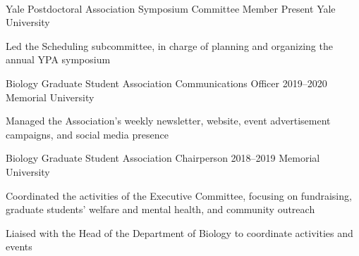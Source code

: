\\

\begin{cventries}

  \cventry
    {Yale Postdoctoral Association} %
    {Symposium Committee Member} %
    {Present} %
    {Yale University} %
    {
      \begin{cvitems} %
        \item {Led the Scheduling subcommittee, in charge of planning and organizing the annual YPA symposium}
      \end{cvitems}
    }

  \cventry
    {Biology Graduate Student Association} %
    {Communications Officer} %
    {2019--2020} %
    {Memorial University} %
    {
      \begin{cvitems} %
        \item {Managed the Association's weekly newsletter, website, event advertisement campaigns, and social media presence}
      \end{cvitems}
    }

  \cventry
    {Biology Graduate Student Association} %
    {Chairperson} %
    {2018--2019} %
    {Memorial University} %
    {
      \begin{cvitems} %
        \item {Coordinated the activities of the Executive Committee, focusing on fundraising, graduate students' welfare and mental health, and community outreach}
        \item {Liaised with the Head of the Department of Biology to coordinate activities and events}
      \end{cvitems}
    }


\end{cventries}
